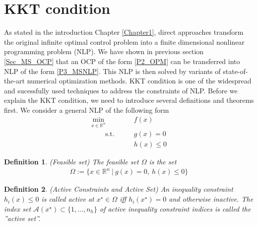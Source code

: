 \documentclass  [
  paper    = a4,
  BCOR     = 10mm,
  twoside,
  fontsize = 12pt,
  fleqn,
  toc      = bibnumbered,
  toc      = listofnumbered,
  numbers  = noendperiod,
  headings = normal,
  listof   = leveldown,
  version  = 3.03
]                                       {scrreprt}
\newcommand{\<}{\langle}
\renewcommand{\>}{\rangle}
\newtheorem{definition}{Definition}
\begin{document}

\section{KKT condition}
\label{Sec_KKT}
As stated in the introduction Chapter \ref{Chapter1}, direct approaches transform the original infinite optimal control problem into a finite dimensional nonlinear programming problem (NLP). We have shown in previous section \ref{Sec_MS_OCP} that an OCP of the form \ref{P2_OPM} can be transferred into NLP of the form \ref{P3_MSNLP}. This NLP is then solved by variants of state-of-the-art numerical optimization methods. KKT condition is one of the widespread and sucessfully used techniques to address the constraints of NLP.  Before we explain the KKT condition, we need to introduce several definitions and theorems first. We consider a general NLP of the following form
\begin{equation}
	\label{eq:OCP_discret_compact}
	\begin{aligned}
		\underset{x \in \mathbb{R}^n}{\text{min}} \qquad &f(x)	\\
		\qquad \text{s.t.}\qquad	&  g(x)	 = 0   \\
		&  h(x)	\leq 0 
	\end{aligned}
\end{equation}
\begin{definition}(Feasible set) The feasible set $\Omega$ is the set 
	\begin{align}
		\Omega:= \{x \in \mathbb{R}^n \ | \ g(x)= 0 , \ h(x)	\leq 0 \}	
	\end{align}
\end{definition}	
\begin{definition}(Active Constraints and Active Set) An inequality constraint $h_i(x) \leq 0$ is called active at $x^\star \in  \Omega$  iff  $h_i(x^\star) = 0$ and otherwise inactive. The index set $\mathcal{A}(x^\star) \subset \{1, ..., n_h\}$  of active inequality constraint indices is called the ”active set”.
\end{definition}
\end{document}
